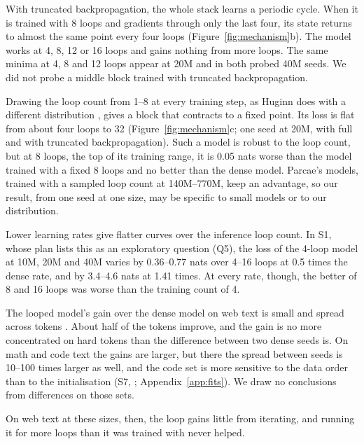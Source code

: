 With truncated backpropagation, the whole stack learns a periodic cycle. When it is trained with 8 loops and gradients
through only the last four, its state returns to almost the same point every four loops (Figure~\ref{fig:mechanism}b).
The model works at 4, 8, 12 or 16 loops and gains nothing from more loops. The same minima at 4, 8 and 12
loops appear at 20M and in both probed 40M seeds. We did not probe a middle block trained with truncated backpropagation.

Drawing the loop count from 1--8 at every training step, as Huginn does with a different distribution
\citep{geiping2025scaling}, gives a block that contracts to a fixed point. Its loss is flat from about four loops to 32
(Figure~\ref{fig:mechanism}c; one seed at 20M, with full and with truncated backpropagation). Such a model is robust to
the loop count, but at 8 loops, the top of its training range, it is 0.05 nats worse than the model trained with a
fixed 8 loops and no better than the dense model. Parcae's models, trained with a sampled loop count at 140M--770M, keep
an advantage, so our result, from one seed at one size, may be specific to small models or to our distribution.

Lower learning rates give flatter curves over the inference loop count. In S1, whose plan lists this as an exploratory
question (Q5), the loss of the 4-loop model at 10M, 20M and 40M varies by 0.36--0.77 nats over 4--16 loops at 0.5 times
the dense rate, and by 3.4--4.6 nats at 1.41 times. At every rate, though, the better of 8 and 16 loops was worse than
the training count of 4.

The looped model's gain over the dense model on web text is small and spread across tokens . About
half of the tokens improve, and the gain is no more concentrated on hard tokens than the difference between two dense
seeds is. On math and code text the gains are larger, but there the spread between seeds is 10--100 times larger as
well, and the code set is more sensitive to the data order than to the initialisation (S7, ;
Appendix~\ref{app:fits}). We draw no conclusions from differences on those sets.

On web text at these sizes, then, the loop gains little from iterating, and running it for more loops than it was
trained with never helped.
